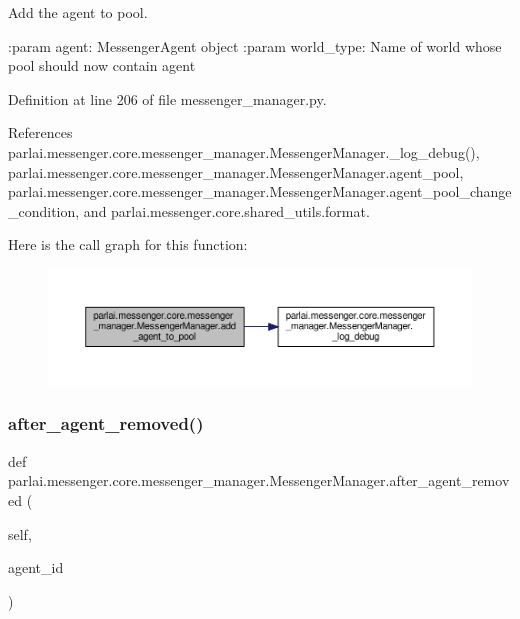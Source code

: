 \begin{DoxyVerb}Add the agent to pool.

:param agent:
    MessengerAgent object
:param world_type:
    Name of world whose pool should now contain agent
\end{DoxyVerb}
 

Definition at line 206 of file messenger\+\_\+manager.\+py.



References parlai.\+messenger.\+core.\+messenger\+\_\+manager.\+Messenger\+Manager.\+\_\+log\+\_\+debug(), parlai.\+messenger.\+core.\+messenger\+\_\+manager.\+Messenger\+Manager.\+agent\+\_\+pool, parlai.\+messenger.\+core.\+messenger\+\_\+manager.\+Messenger\+Manager.\+agent\+\_\+pool\+\_\+change\+\_\+condition, and parlai.\+messenger.\+core.\+shared\+\_\+utils.\+format.

Here is the call graph for this function\+:
\nopagebreak
\begin{figure}[H]
\begin{center}
\leavevmode
\includegraphics[width=350pt]{classparlai_1_1messenger_1_1core_1_1messenger__manager_1_1MessengerManager_ac2b682c0085e42b1e14db6e973a5913d_cgraph}
\end{center}
\end{figure}
\mbox{\label{classparlai_1_1messenger_1_1core_1_1messenger__manager_1_1MessengerManager_a238fe5e22bbe928848709edade7ba06c}} 
\subsubsection{\texorpdfstring{after\+\_\+agent\+\_\+removed()}{after\_agent\_removed()}}
{\footnotesize\ttfamily def parlai.\+messenger.\+core.\+messenger\+\_\+manager.\+Messenger\+Manager.\+after\+\_\+agent\+\_\+removed (\begin{DoxyParamCaption}\item[{}]{self,  }\item[{}]{agent\+\_\+id }\end{DoxyParamCaption})}

